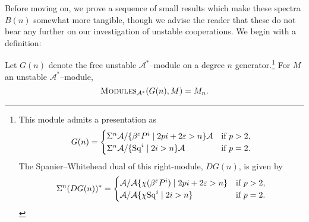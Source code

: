 Before moving on, we prove a sequence of small results which make these spectra \(B(n)\) somewhat more tangible, though we advise the reader that these do not bear any further on our investigation of unstable cooperations.  We begin with a definition:

\begin{definition}\label{SpanierWhiteheadDualOfGeneratingModule}
Let \(G(n)\) denote the free unstable \(\mathcal A^*\)--module on a degree \(n\) generator.\footnote{This module admits a presentation as \[G(n) = \begin{cases} \Sigma^n \mathcal A / \{\beta^\varepsilon P^i \mid 2pi + 2\varepsilon > n\}\mathcal A & \text{if \(p > 2\)}, \\ \Sigma^n \mathcal A / \{\operatorname{Sq}^i \mid 2i > n\}\mathcal A & \text{if \(p = 2\)}. \end{cases}\]  The Spanier--Whitehead dual of this right-module, \(DG(n)\), is given by \[\Sigma^n (D G(n))^* = \begin{cases}\mathcal A / \mathcal A \{\chi(\beta^\varepsilon P^i) \mid 2pi + 2\varepsilon > n\} & \text{if \(p > 2\)}, \\ \mathcal A / \mathcal A \{\chi{\operatorname{Sq}^i} \mid 2i > n\} & \text{if \(p = 2\)}. \end{cases}\]}  For \(M\) an unstable \(\mathcal A^*\)--module, \[\normalfont\textsc{Modules}_{\mathcal A^*}(G(n), M) = M_n.\]
\end{definition}

